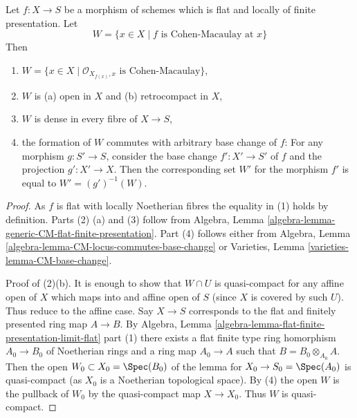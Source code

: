 \begin{lemma}
\label{lemma-flat-finite-presentation-CM-open}
\begin{reference}
\cite[IV Corollary 12.1.7(iii)]{EGA}
\end{reference}
Let $f : X \to S$ be a morphism of schemes which is flat and locally
of finite presentation. Let
$$
W = \{x \in X \mid f\text{ is Cohen-Macaulay at }x\}
$$
Then
\begin{enumerate}
\item $W = \{x \in X \mid \mathcal{O}_{X_{f(x)}, x}\text{ is Cohen-Macaulay}\}$,
\item $W$ is (a) open in $X$ and (b) retrocompact in $X$,
\item $W$ is dense in every fibre of $X \to S$,
\item the formation of $W$ commutes with arbitrary base change of $f$:
For any morphism $g : S' \to S$, consider
the base change $f' : X' \to S'$ of $f$ and the
projection $g' : X' \to X$. Then the corresponding
set $W'$ for the morphism $f'$ is equal to $W' = (g')^{-1}(W)$.
\end{enumerate}
\end{lemma}

\begin{proof}
As $f$ is flat with locally Noetherian fibres the equality in (1) holds
by definition. Parts (2) (a) and (3) follow from
Algebra, Lemma \ref{algebra-lemma-generic-CM-flat-finite-presentation}.
Part (4) follows either from
Algebra, Lemma \ref{algebra-lemma-CM-locus-commutes-base-change}
or
Varieties, Lemma \ref{varieties-lemma-CM-base-change}.

\medskip\noindent
Proof of (2)(b). It is enough to show that $W \cap U$ is
quasi-compact for any affine open of $X$ which maps into
and affine open of $S$ (since $X$ is covered by such $U$).
Thus reduce to the affine case. Say $X \to S$ corresponds to
the flat and finitely presented ring map $A \to B$.
By Algebra, Lemma \ref{algebra-lemma-flat-finite-presentation-limit-flat}
part (1) there exists a flat finite type ring homorphism $A_0 \to B_0$
of Noetherian rings and a ring map $A_0 \to A$ such that
$B = B_0 \otimes_{A_0} A$. Then the open $W_0 \subset X_0 = \Spec(B_0)$
of the lemma for $X_0 \to S_0 = \Spec(A_0)$
is quasi-compact (as $X_0$ is a Noetherian topological space).
By (4) the open $W$ is the pullback of $W_0$ by the quasi-compact
map $X \to X_0$. Thus $W$ is quasi-compact.
\end{proof}

